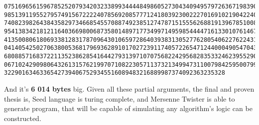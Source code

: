 \documentclass{article}
\begin{document}
\begin{verbatim}
075169656159678525207934203233899344448498605273043409495797263671983903177813894870234178193048
985139119552795749156722224078569208577712418039230022270169102190422407189239481858729423060879
740823982643843582973466854557088749238512747871515556268819139678510083447042573649868595765374
954138342181211640366980068735801489717734997149598544447161330107614677308895400695374753720929
413500806180693381283178709643010659728640393831305277628054062276224313790680858028828874051157
041405425027063800536817969362891017027239117405722654712440004905470434497609145813901612690366
680885716837221135238628541644279313971070756822429568283533246239552909760329141773722636485828
067102429098064326131576219970710822305711373213499473110079842595007992530529404302853618434765
32290163463365427394067529345516089483216889987374092363235328
\end{verbatim}

And it's \textbf{6 014 bytes} big. Given all these partial arguments, the final and proven thesis is, Seed language is turing complete, and Mersenne Twister is able to generate program, that will be capable of simulating any algorithm's logic can be constructed.
\end{document}
